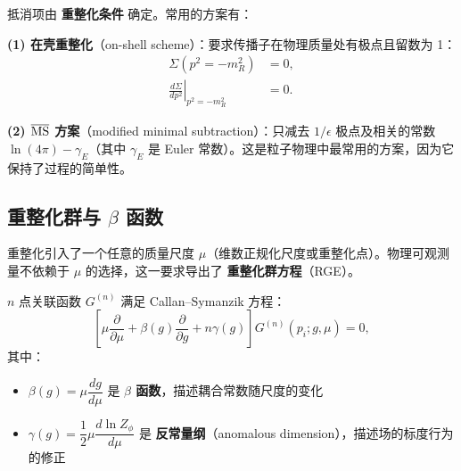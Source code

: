 \begin{theorem}[重整化条件]
抵消项由 \textbf{重整化条件} 确定。常用的方案有：

\textbf{(1) 在壳重整化}（on-shell scheme）：要求传播子在物理质量处有极点且留数为 1：
\begin{align}
    \Sigma(p^2 = -m_R^2) &= 0, \\
    \left.\frac{d\Sigma}{dp^2}\right|_{p^2=-m_R^2} &= 0.
\end{align}

\textbf{(2) $\overline{\rm MS}$ 方案}（modified minimal subtraction）：只减去 $1/\epsilon$ 极点及相关的常数 $\ln(4\pi) - \gamma_E$（其中 $\gamma_E$ 是 Euler 常数）。这是粒子物理中最常用的方案，因为它保持了过程的简单性。
\end{theorem}


\subsection{重整化群与 $\beta$ 函数}

重整化引入了一个任意的质量尺度 $\mu$（维数正规化尺度或重整化点）。物理可观测量不依赖于 $\mu$ 的选择，这一要求导出了 \textbf{重整化群方程}（RGE）。

\begin{theorem}
$n$ 点关联函数 $G^{(n)}$ 满足 Callan--Symanzik 方程：
\begin{equation}
    \left[\mu\frac{\partial}{\partial\mu} + \beta(g)\frac{\partial}{\partial g} + n\gamma(g)\right]G^{(n)}(p_i; g, \mu) = 0,
\end{equation}
其中：
\begin{itemize}
    \item $\beta(g) = \mu\dfrac{dg}{d\mu}$ 是 \textbf{$\beta$ 函数}，描述耦合常数随尺度的变化
    \item $\gamma(g) = \dfrac{1}{2}\mu\dfrac{d\ln Z_\phi}{d\mu}$ 是 \textbf{反常量纲}（anomalous dimension），描述场的标度行为的修正
\end{itemize}
\end{theorem}

